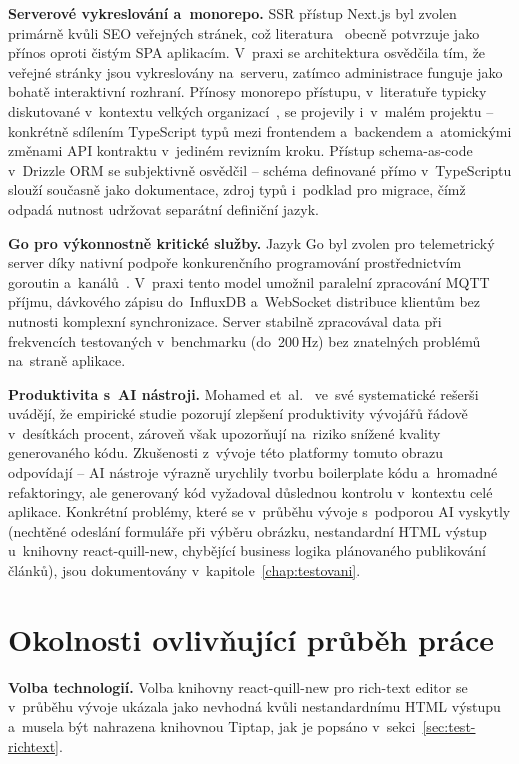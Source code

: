 \textbf{Serverové vykreslování a~monorepo.} SSR přístup Next.js byl zvolen primárně kvůli SEO veřejných stránek, což literatura~\cite{pati2025nextjs} obecně potvrzuje jako přínos oproti čistým SPA aplikacím. V~praxi se architektura osvědčila tím, že veřejné stránky jsou vykreslovány na~serveru, zatímco administrace funguje jako bohatě interaktivní rozhraní. Přínosy monorepo přístupu, v~literatuře typicky diskutované v~kontextu velkých organizací~\cite{potvin2016monorepo}, se projevily i~v~malém projektu -- konkrétně sdílením TypeScript typů mezi frontendem a~backendem a~atomickými změnami API kontraktu v~jediném revizním kroku. Přístup schema-as-code v~Drizzle ORM se subjektivně osvědčil -- schéma definované přímo v~TypeScriptu slouží současně jako dokumentace, zdroj typů i~podklad pro migrace, čímž odpadá nutnost udržovat separátní definiční jazyk.

\textbf{Go pro výkonnostně kritické služby.} Jazyk Go byl zvolen pro telemetrický server díky nativní podpoře konkurenčního programování prostřednictvím goroutin a~kanálů~\cite{donovan2015go, gospec2024}. V~praxi tento model umožnil paralelní zpracování MQTT příjmu, dávkového zápisu do~InfluxDB a~WebSocket distribuce klientům bez nutnosti komplexní synchronizace. Server stabilně zpracovával data při frekvencích testovaných v~benchmarku (do~200\,Hz) bez znatelných problémů na~straně aplikace.

\textbf{Produktivita s~AI nástroji.} Mohamed et~al.~\cite{mohamed2025llmproductivity} ve~své systematické rešerši uvádějí, že empirické studie pozorují zlepšení produktivity vývojářů řádově v~desítkách procent, zároveň však upozorňují na~riziko snížené kvality generovaného kódu. Zkušenosti z~vývoje této platformy tomuto obrazu odpovídají -- AI nástroje výrazně urychlily tvorbu boilerplate kódu a~hromadné refaktoringy, ale generovaný kód vyžadoval důslednou kontrolu v~kontextu celé aplikace. Konkrétní problémy, které se v~průběhu vývoje s~podporou AI vyskytly (nechtěné odeslání formuláře při výběru obrázku, nestandardní HTML výstup u~knihovny react-quill-new, chybějící business logika plánovaného publikování článků), jsou dokumentovány v~kapitole~\ref{chap:testovani}.

\section{Okolnosti ovlivňující průběh práce}

\textbf{Volba technologií.} Volba knihovny react-quill-new pro rich-text editor se v~průběhu vývoje ukázala jako nevhodná kvůli nestandardnímu HTML výstupu a~musela být nahrazena knihovnou Tiptap, jak je popsáno v~sekci~\ref{sec:test-richtext}.

